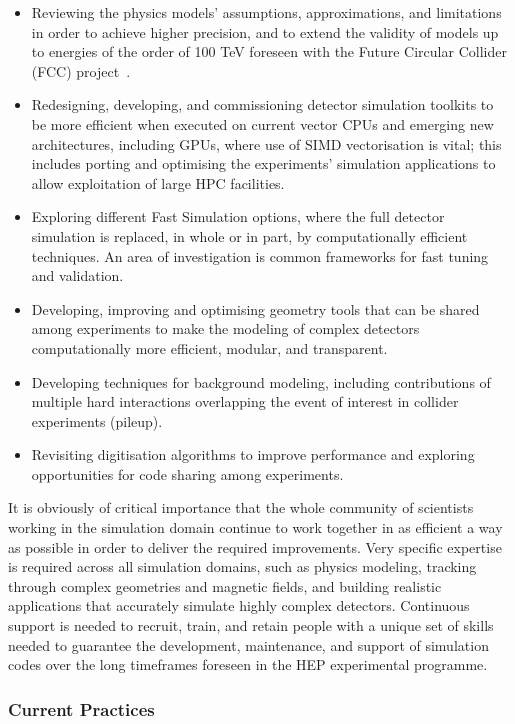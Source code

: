 \begin{itemize}
\item
  Reviewing the physics models' assumptions, approximations, and
  limitations in order to achieve higher precision, and to extend the
  validity of models up to energies of the order of 100 TeV foreseen
  with the Future Circular Collider (FCC) project~\cite{FCC}.
\item
  Redesigning, developing, and commissioning detector simulation
  toolkits to be more efficient when executed on current vector CPUs and
  emerging new architectures, including GPUs, where use of SIMD
  vectorisation is vital; this includes porting and optimising the
  experiments' simulation applications to allow exploitation of large
  HPC facilities.
\item
  Exploring different Fast Simulation options, where the full detector
  simulation is replaced, in whole or in part, by computationally
  efficient techniques. An area of investigation is common frameworks
  for fast tuning and validation.
\item
  Developing, improving and optimising geometry tools that can be shared
  am\-ong experiments to make the modeling of complex detectors
  computationally more efficient, modular, and transparent.
\item
  Developing techniques for background modeling, including contributions
  of multiple hard interactions overlapping the event of interest in
  collider experiments (pileup).
\item
  Revisiting digitisation algorithms to improve performance and
  exploring opportunities for code sharing among experiments.
\end{itemize}

It is obviously of critical importance that the whole community of
scientists working in the simulation domain continue to work together in
as efficient a way as possible in order to deliver the required
improvements. Very specific expertise is required across all simulation
domains, such as physics modeling, tracking through complex geometries
and magnetic fields, and building realistic applications that accurately
simulate highly complex detectors. Continuous support is needed to
recruit, train, and retain people with a unique set of skills needed to
guarantee the development, maintenance, and support of simulation codes
over the long timeframes foreseen in the HEP experimental programme.

\subsubsection*{Current Practices}

